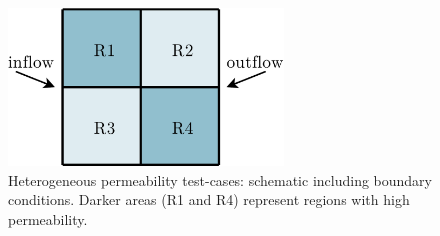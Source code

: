 \begin{figure}[h]
  \begin{center}
    \includegraphics[width=0.65\textwidth]{4Rregion_BL}
    \caption{Heterogeneous permeability test-cases: schematic including boundary conditions. Darker areas (R1 and R4) represent regions with high permeability.\label{fig:4reg_BL_schematic}}
  \end{center}
\end{figure}

